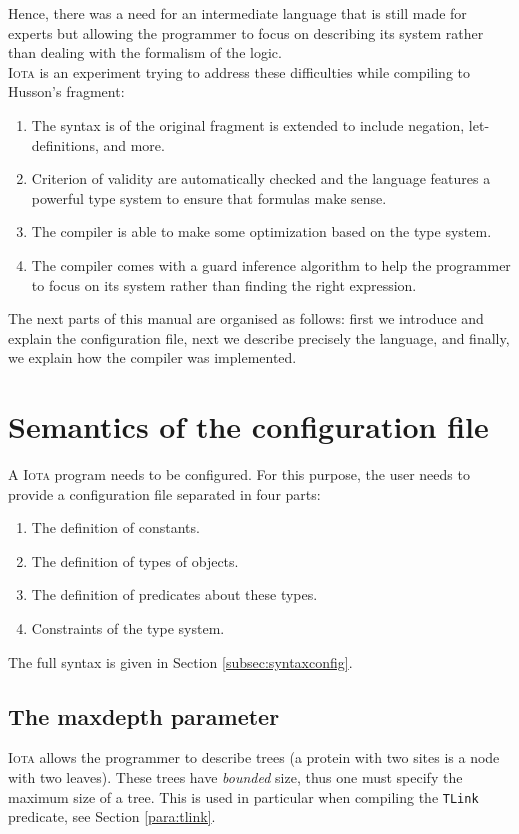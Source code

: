 \documentclass[10pt,a4paper]{article}
\newcommand\Iota{\textsc{Iota}}
\newcommand{\ocaml}{\texttt}
\begin{document}
Hence, there was a need for an intermediate language that is still made for experts but allowing the programmer to focus on describing its system rather than dealing with the formalism of the logic.\\
\Iota{} is an experiment trying to address these difficulties while compiling to Husson's fragment:
\begin{enumerate}
\item The syntax is of the original fragment is extended to include negation, let-definitions, and more.
\item Criterion of validity are automatically checked and the language features a powerful type system to ensure that formulas make sense.
\item The compiler is able to make some optimization based on the type system.
\item The compiler comes with a guard inference algorithm to help the programmer to focus on its system rather than finding the right expression.
\end{enumerate}

The next parts of this manual are organised as follows: first we introduce and explain the configuration file, next we describe precisely the language, and finally, we explain how the compiler was implemented.

\section{Semantics of the configuration file}
A \Iota{} program needs to be configured. For this purpose, the user needs to provide a configuration file separated in four parts:
\begin{enumerate}
\item The definition of constants.
\item The definition of types of objects.
\item The definition of predicates about these types.
\item Constraints of the type system.
\end{enumerate}

The full syntax is given in Section \ref{subsec:syntaxconfig}.
\subsection{The maxdepth parameter}
\Iota{} allows the programmer to describe trees (a protein with two sites is a node with two leaves). These trees have \emph{bounded} size, thus one must specify the maximum size of a tree. This is used in particular when compiling the \ocaml{TLink} predicate, see Section \ref{para:tlink}.
\end{document}
